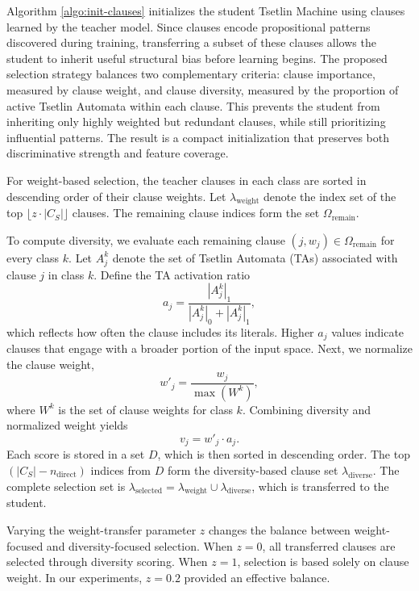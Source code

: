 \documentclass[sn-mathphys-num]{sn-jnl}%
\theoremstyle{thmstyleone}%
\theoremstyle{thmstyletwo}%
\theoremstyle{thmstylethree}%
\begin{document}
Algorithm \ref{algo:init-clauses} initializes the student Tsetlin Machine using clauses learned by the teacher model. Since clauses encode propositional patterns discovered during training, transferring a subset of these clauses allows the student to inherit useful structural bias before learning begins. The proposed selection strategy balances two complementary criteria: clause importance, measured by clause weight, and clause diversity, measured by the proportion of active Tsetlin Automata within each clause. This prevents the student from inheriting only highly weighted but redundant clauses, while still prioritizing influential patterns. The result is a compact initialization that preserves both discriminative strength and feature coverage.

For weight-based selection, the teacher clauses in each class are sorted in descending order of their clause weights. Let $\lambda_{\text{weight}}$ denote the index set of the top $\lfloor z\cdot|C_S|\rfloor$ clauses. The remaining clause indices form the set $\Omega_{\text{remain}}$.

To compute diversity, we evaluate each remaining clause $(j,w_j) \in \Omega_{\text{remain}}$ for every class $k$. Let $A_j^k$ denote the set of Tsetlin Automata (TAs) associated with clause $j$ in class $k$. Define the TA activation ratio
\[
a_j = \frac{|A_j^k|_1}{|A_j^k|_0 + |A_j^k|_1},
\]
which reflects how often the clause includes its literals. Higher $a_j$ values indicate clauses that engage with a broader portion of the input space. Next, we normalize the clause weight,
\[
w'_j = \frac{w_j}{\max(W^k)},
\]
where $W^k$ is the set of clause weights for class $k$. Combining diversity and normalized weight yields
\[
v_j = w'_j \cdot a_j.
\]
Each score is stored in a set $D$, which is then sorted in descending order. The top $(|C_S| - n_{\text{direct}})$ indices from $D$ form the diversity-based clause set $\lambda_{\text{diverse}}$. The complete selection set is $\lambda_{\text{selected}} = \lambda_{\text{weight}} \cup \lambda_{\text{diverse}}$, which is transferred to the student.

Varying the weight-transfer parameter $z$ changes the balance between weight-focused and diversity-focused selection. When $z=0$, all transferred clauses are selected through diversity scoring. When $z=1$, selection is based solely on clause weight. In our experiments, $z=0.2$ provided an effective balance.
\end{document}
